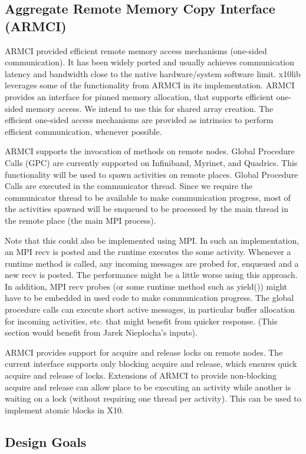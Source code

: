 \documentclass{article}
\begin{document}
\subsection{Aggregate Remote Memory Copy Interface (ARMCI)}
ARMCI provided efficient remote memory access mechanisms (one-sided
communication). It has been widely ported and usually achieves
communication latency and bandwidth close to the native
hardware/system software limit. x10lib leverages some of the
functionality from ARMCI in its implementation. ARMCI provides an
interface for pinned memory allocation, that supports efficient
one-sided memory access. We intend to use this for shared array
creation. The efficient one-sided access mechanisms are provided as
intrinsics to perform efficient communication, whenever
possible. 

ARMCI supports the invocation of methods on remote
nodes. Global Procedure Calls (GPC) are currently supported on
Infiniband, Myrinet, and Quadrics. This functionality will be used to
spawn activities on remote places. Global Procedure Calls are
executed in the communicator thread. Since we require the communicator
thread to be available to make communication progress, most of the
activities spawned will be enqueued to be processed by the main thread
in the remote place (the main MPI process). 

Note that this could also be implemented using MPI. In such an
implementation, an MPI recv is posted and the runtime executes the
some activity. Whenever a runtime method is called, any incoming
messages are probed for, enqueued and a new recv is posted. The
performance might be a little worse using this approach. In addition,
MPI recv probes (or some runtime method such as yield()) might have to
be embedded in used code to make communication progress. The
global procedure calls can execute short active messages, in
particular buffer allocation for incoming activities, etc. that might
benefit from quicker response. (This section would benefit from Jarek
Nieplocha's inputs). 

ARMCI provides support for acquire and release locks on remote
nodes. The current interface supports only blocking acquire and
release, which ensures quick acquire and release of locks. Extensions
of ARMCI to provide non-blocking acquire and release can allow place
to be executing an activity while another is waiting on a lock
(without requiring one thread per activity). This can be used to
implement atomic blocks in X10.


\subsection{Design Goals}
\end{document}
